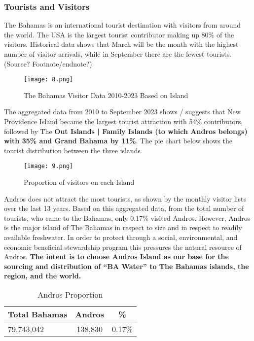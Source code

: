 \documentclass{article}
\begin{document}
\subsubsection{Tourists and Visitors}
The Bahamas is an international tourist destination with visitors from around the world. The USA is the largest tourist contributor making up  80\% of the visitors. Historical data shows that March will be the month with the highest number of visitor arrivals, while in September there are the fewest tourists. (Source? Footnote/endnote?) 

\begin{figure}[H]
\centering
\texttt{[image: 8.png]}
\caption{The Bahamas Visitor Data 2010-2023 Based on Island}
\label{fig:unique_label_8}
\end{figure}

The aggregated data from 2010 to September 2023 shows / suggests that New Providence Island became the largest tourist attraction with 54\% contributors, followed by The \textbf{Out Islands | Family Islands (to which Andros belongs) with 35\% and Grand Bahama by 11\%}. The pie chart below shows the tourist distribution between the three islands. 

\begin{figure}[H]
\centering
\texttt{[image: 9.png]}
\caption{Proportion of visitors on each Island}
\label{fig:unique_label_9}
\end{figure}

Andros does not attract the most tourists, as shown by the monthly visitor lists over the last 13 years. Based on this aggregated data, from the total number of tourists, who came to the Bahamas, only 0.17\% visited Andros. However, Andros is the major island of The Bahamas in respect to size and in respect to readily available freshwater. In order to protect through a social, environmental, and economic beneficial stewardship program this pressures the natural resource of Andros. \textbf{The intent is to choose Andros Island as our base for the sourcing and distribution of “BA Water” to The Bahamas islands, the region, and the world. }

\begin{table}[h]
\centering
\begin{tabular}{lcc}
\toprule
Total Bahamas & Andros & \% \\
\midrule
79,743,042 & 138,830 & 0.17\% \\
\bottomrule
\end{tabular}
\caption{Andros Proportion}
\label{tab:my_table}
\end{table}
\end{document}
